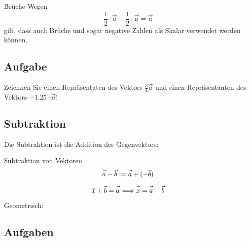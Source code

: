 \begin{beispiel}{Brüche}{}
  Wegen
  $$\frac12\cdot{}\vec{a} + \frac12\cdot{}\vec{a} = \vec{a}$$
  gilt, dass auch Brüche und sogar  negative Zahlen als Skalar
  verwendet werden können.
\end{beispiel}
\newpage

\subsection*{Aufgabe}
Zeichnen Sie einen Repräsentaten des Vektors $\frac34\vec{a}$ und einen Repräsentanten des Vektors $-1.25 \cdot{} \vec{a}$!


\newpage


\subsection{Subtraktion}

Die Subtraktion ist die Addition des Gegenvektors:

\begin{definition}{Subtraktion von Vektoren}{}
  $$\vec{a\vphantom{b}} - \vec{b} := \vec{a\vphantom{b}} + (-\vec{b})$$
\end{definition}

\begin{bemerkung}{}{}
  $$\vec{x\vphantom{x}} + \vec{b} = \vec{a\vphantom{b}} \Longleftrightarrow \vec{x\vphantom{b}} = \vec{a\vphantom{b}} - \vec{b}$$
\end{bemerkung}

Geometrisch:


\subsection*{Aufgaben}
\newpage



